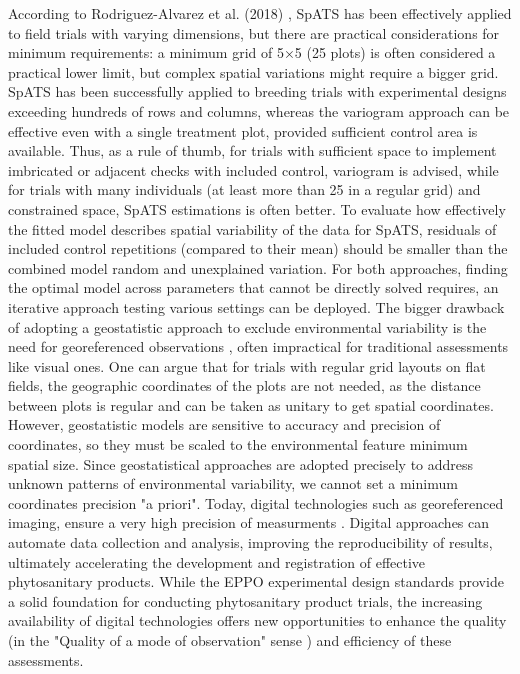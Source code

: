 \documentclass[12pt,a4paper,oneside]{report}
\begin{document}
According to Rodriguez-Alvarez et al. (2018) 
\cite{rodriguez-alvarezCorrectingSpatialHeterogeneity2018}, 
SpATS has been effectively applied 
to field trials with varying dimensions, but there are practical considerations 
for minimum requirements: a minimum grid of 5×5 (25 plots) is often considered a 
practical lower limit, but complex spatial variations might require a bigger grid.
SpATS has been successfully applied to breeding trials with experimental designs 
exceeding hundreds of rows and columns, whereas the variogram approach can be effective 
even with a single treatment plot, provided sufficient control area is available.
Thus, as a rule of thumb, for trials with sufficient space to implement imbricated
or adjacent checks with included control, variogram is advised,
while for trials with many individuals (at least more than 25 in a regular grid) 
and constrained space, SpATS estimations is often better.
To evaluate how effectively the fitted model describes spatial variability of the 
data for SpATS, 
residuals of included control repetitions (compared to their mean) should be 
smaller than the combined model random and unexplained variation.
For both approaches, finding the optimal model across parameters that cannot be 
directly solved requires, 
an iterative approach testing various settings can be deployed. 
The bigger drawback of adopting a geostatistic approach to exclude environmental
variability is the need for georeferenced observations 
\cite{oliverGeostatisticalApplicationsPrecision2010,websterGeostatisticsEnvironmentalScientists2007}, 
often impractical for traditional
assessments like visual ones. One can argue that for trials with regular grid 
layouts on flat fields, the geographic coordinates of the plots are not needed, as
the distance between plots is regular and can be taken as unitary to get spatial coordinates.
However, geostatistic models are sensitive to accuracy and precision of coordinates,
so they must be scaled to the environmental feature minimum spatial size. 
Since geostatistical approaches are adopted precisely to address unknown patterns 
of environmental variability, 
we cannot set a minimum coordinates precision "a priori".
Today, digital technologies such as georeferenced imaging, ensure a very high precision
of measurments \cite{mahleinPlantDiseaseDetection2016}. 
Digital approaches can automate data collection and analysis, improving the
reproducibility of results, ultimately accelerating the development and registration of
effective phytosanitary products.
While the EPPO experimental design standards provide a solid foundation for conducting
phytosanitary product trials, the increasing availability of digital technologies
offers new opportunities to enhance the quality (in the "Quality of a mode of observation" sense \cite{EPPO_PP1_152}) 
and efficiency of these assessments.
\end{document}
